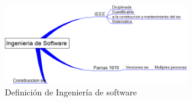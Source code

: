 \begin{figure}[h!] \centering
\includegraphics[angle=0,width=80mm]{capitulo1/definiciones_cppa.png} 
\caption{Definici\'on de Ingenier\'ia de software}
\label{figuragoogle}
\end{figure}
